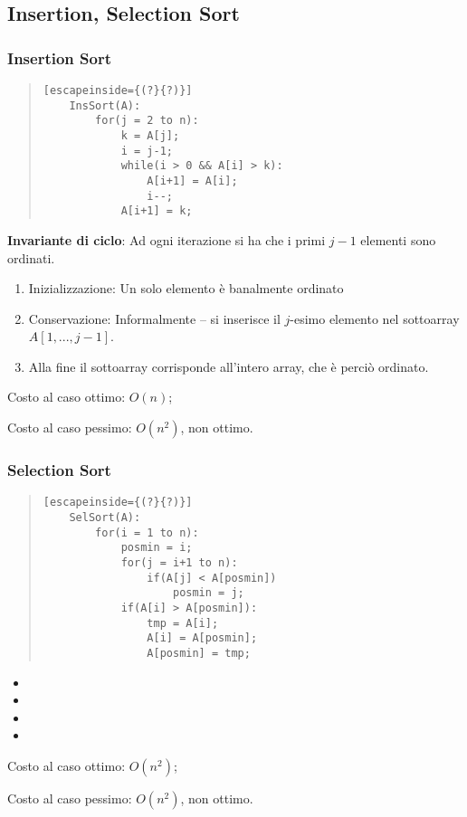 \documentclass[a4paper,10pt]{article}
\theoremstyle{definition}
\begin{document}
\subsection{Insertion, Selection Sort}
\begin{multicols}{2}
 
\subsubsection{Insertion Sort}
\begin{quote}\begin{lstlisting}[escapeinside={(?}{?)}]
	InsSort(A):
        for(j = 2 to n):
            k = A[j];
            i = j-1;
            while(i > 0 && A[i] > k):
                A[i+1] = A[i];
                i--;
            A[i+1] = k;
\end{lstlisting}\end{quote}


\textbf{Invariante di ciclo}: Ad ogni iterazione si ha che i primi $j-1$ elementi sono ordinati.
\begin{enumerate}
 \item Inizializzazione: Un solo elemento è banalmente ordinato
 \item Conservazione: Informalmente -- si inserisce il $j$-esimo elemento nel sottoarray $A[1,...,j-1]$.
 \item Alla fine il sottoarray corrisponde all'intero array, che è perciò ordinato.
\end{enumerate}

Costo al caso ottimo: $O(n)$;

Costo al caso pessimo: $O(n^2)$, non ottimo.

\end{multicols}
\begin{multicols}{2}
\subsubsection{Selection Sort}
\begin{quote}\begin{lstlisting}[escapeinside={(?}{?)}]
	SelSort(A):
        for(i = 1 to n):
            posmin = i;
            for(j = i+1 to n):
                if(A[j] < A[posmin])
                    posmin = j;
            if(A[i] > A[posmin]):
                tmp = A[i];
                A[i] = A[posmin];
                A[posmin] = tmp;
\end{lstlisting}\end{quote}
\begin{itemize}
 \item[]
 \item[]
 \item[]
 \item[]
\end{itemize}

Costo al caso ottimo: $O(n^2)$;

Costo al caso pessimo: $O(n^2)$, non ottimo.
\end{multicols}
\end{document}
